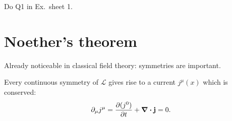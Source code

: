 \begin{example}
Do Q1 in Ex.~sheet 1.
\end{example}

\section{Noether's theorem}%
\label{sec:noether_s_theorem}

Already noticeable in classical field theory: symmetries are important.

\begin{theorem}
  Every continuous symmetry of $\mathcal{L}$ gives rise to a current $j^\mu(x)$ which is conserved:
  \begin{equation}
    \partial_\mu j^\mu = \pdv{(j^0)}{t} + \div \vb{j} = 0.
  \end{equation}
\end{theorem}

